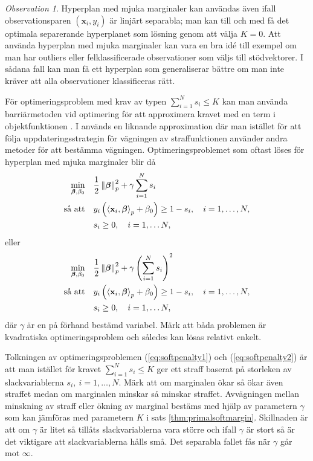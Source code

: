 \documentclass[a4paper, 12pt]{report}
\theoremstyle{definition}
\theoremstyle{remark}
\newtheorem*{rem}{Observation}
\newcommand{\bfbeta}{{\boldsymbol{\beta}}}
\newcommand{\bfx}{\mathbf{x}}
\newcommand{\llangle}{\left\langle}
\newcommand{\rrangle}{\right\rangle}
\newcommand{\inner}[2]{\llangle #1, #2 \rrangle}
\begin{document}
\begin{rem}
	Hyperplan med mjuka marginaler kan användas även ifall observationsparen $\left(\mathbf{x}_i,y_i\right)$ är linjärt separabla; man kan till och med få det optimala separerande hyperplanet som lösning genom att välja $K=0$. Att använda hyperplan med mjuka marginaler kan vara en bra idé till exempel om man har outliers eller felklassificerade observationer som väljs till stödvektorer. I sådana fall kan man få ett hyperplan som generaliserar bättre om man inte kräver att alla observationer klassificeras rätt.
\end{rem}

För optimeringsproblem med krav av typen $\sum_{i=1}^{N}s_i\leq K$ kan man använda barriärmetoden vid optimering för att approximera kravet med en term i objektfunktionen \cite{Boyd}. I \cite{CortesVapnik} används en liknande approximation där man istället för att följa uppdateringsstrategin för vägningen av straffunktionen använder andra metoder för att bestämma vägningen. Optimeringsproblemet som oftast löses för hyperplan med mjuka marginaler blir då
\begin{equation}\label{eq:softpenalty1}
\begin{aligned}
	\operatornamewithlimits{min}_{\bfbeta,\beta_0} & & &\frac{1}{2}\left\|\bfbeta
\right\|_p^2 + \gamma\sum_{i=1}^{N} s_i\\
	\text{så att} & & &y_i\left(\inner{\bfx_i}{\bfbeta}_p+\beta_0\right)\geq 1 - s_i,\quad i=1,\dots,N,\\
	& & &s_i\geq0,\quad i=1,\dots N,
\end{aligned}
\end{equation}
eller
\begin{equation}\label{eq:softpenalty2}
\begin{aligned}
\operatornamewithlimits{min}_{\bfbeta,\beta_0} & & &\frac{1}{2}\left\|\bfbeta
\right\|_p^2 + \gamma\left(\sum_{i=1}^{N} s_i\right)^2\\
\text{så att} & & &y_i\left(\inner{\bfx_i}{\bfbeta}_p+\beta_0\right)\geq 1 - s_i,\quad i=1,\dots,N,\\
& & &s_i\geq0,\quad i=1,\dots N,
\end{aligned}
\end{equation}
där $\gamma$ är en på förhand bestämd variabel.
Märk att båda problemen är kvadratiska optimeringsproblem och således kan lösas relativt enkelt.

Tolkningen av optimeringsproblemen (\ref{eq:softpenalty1}) och (\ref{eq:softpenalty2}) är att man istället för kravet $\sum_{i=1}^{N}s_i\leq K$ ger ett straff baserat på storleken av slackvariablerna $s_i,~i=1,\dots,N$. Märk att om marginalen ökar så ökar även straffet medan om marginalen minskar så minskar straffet. Avvägningen mellan minskning av straff eller ökning av marginal bestäms med hjälp av parametern $\gamma$ som kan jämföras med parametern $K$ i sats \ref{thm:primalsoftmargin}. Skillnaden är att om $\gamma$ är litet så tillåts slackvariablerna vara större och ifall $\gamma$ är stort så är det viktigare att slackvariablerna hålls små. Det separabla fallet fås när $\gamma$ går mot $\infty$.
\end{document}
